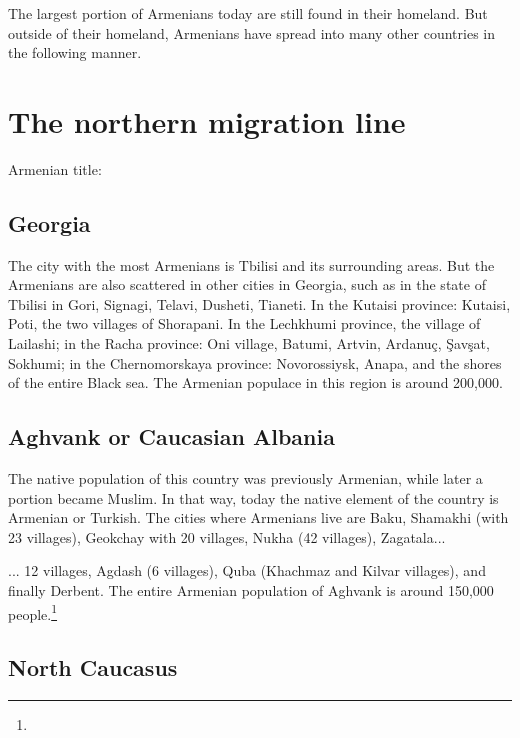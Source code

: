 The largest portion of Armenians today are still found in their homeland. But outside of their homeland, Armenians have spread into many other countries in the following manner. 


\section{The northern migration line}
Armenian title: 
\subsection{Georgia}

The city with the most Armenians is Tbilisi and its surrounding areas. But the Armenians are also scattered in other cities in Georgia, such as in the state of Tbilisi in Gori, Signagi, Telavi, Dusheti, Tianeti. In the Kutaisi province: Kutaisi, Poti, the two villages of Shorapani. In the Lechkhumi province, the village of Lailashi; in the Racha province: Oni village, Batumi, Artvin, Ardanuç, Şavşat, Sokhumi; in the Chernomorskaya province: Novorossiysk, Anapa, and the shores of the entire Black sea. The Armenian populace in this region is around 200,000. 
\subsection{Aghvank or Caucasian Albania}
The native population of this country was previously Armenian, while later a portion became  Muslim. In that way, today the native element of the country is Armenian or Turkish. The cities where Armenians live are Baku, Shamakhi (with 23 villages), Geokchay with 20 villages, Nukha (42 villages), Zagatala... 


\begin{adjarianpage}\label{page:26}\end{adjarianpage}%

... 12 villages, Agdash (6 villages), Quba (Khachmaz and Kilvar villages), and finally Derbent. The entire Armenian population of Aghvank is around 150,000 people.\footnote{}

\subsection{North Caucasus}

